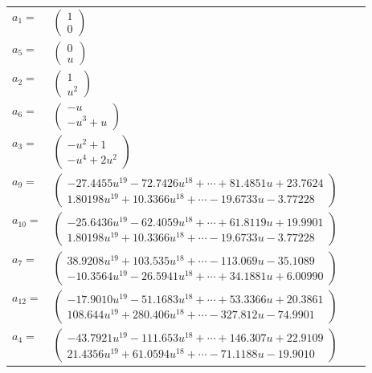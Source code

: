 \documentclass[1p]{elsarticle_modified}
\theoremstyle{definition}
\begin{document}
\begin{tabular}{m{7pt} m{180pt} m{7pt} m{180pt} }
\flushright $a_{1}=$&$\begin{pmatrix}1\\0\end{pmatrix}$ \\
\flushright $a_{5}=$&$\begin{pmatrix}0\\u\end{pmatrix}$ \\
\flushright $a_{2}=$&$\begin{pmatrix}1\\u^2\end{pmatrix}$ \\
\flushright $a_{6}=$&$\begin{pmatrix}- u\\- u^3+u\end{pmatrix}$ \\
\flushright $a_{3}=$&$\begin{pmatrix}- u^2+1\\- u^4+2 u^2\end{pmatrix}$ \\
\flushright $a_{9}=$&$\begin{pmatrix}-27.4455 u^{19}-72.7426 u^{18}+\cdots+81.4851 u+23.7624\\1.80198 u^{19}+10.3366 u^{18}+\cdots-19.6733 u-3.77228\end{pmatrix}$ \\
\flushright $a_{10}=$&$\begin{pmatrix}-25.6436 u^{19}-62.4059 u^{18}+\cdots+61.8119 u+19.9901\\1.80198 u^{19}+10.3366 u^{18}+\cdots-19.6733 u-3.77228\end{pmatrix}$ \\
\flushright $a_{7}=$&$\begin{pmatrix}38.9208 u^{19}+103.535 u^{18}+\cdots-113.069 u-35.1089\\-10.3564 u^{19}-26.5941 u^{18}+\cdots+34.1881 u+6.00990\end{pmatrix}$ \\
\flushright $a_{12}=$&$\begin{pmatrix}-17.9010 u^{19}-51.1683 u^{18}+\cdots+53.3366 u+20.3861\\108.644 u^{19}+280.406 u^{18}+\cdots-327.812 u-74.9901\end{pmatrix}$ \\
\flushright $a_{4}=$&$\begin{pmatrix}-43.7921 u^{19}-111.653 u^{18}+\cdots+146.307 u+22.9109\\21.4356 u^{19}+61.0594 u^{18}+\cdots-71.1188 u-19.9010\end{pmatrix}$ \\

\end{tabular}
\end{document}
